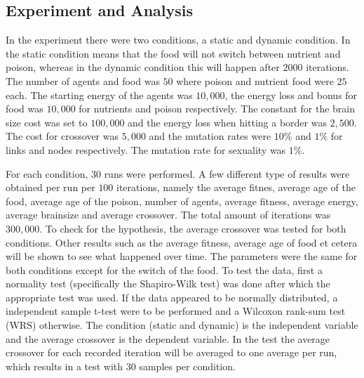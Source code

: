 \subsection{Experiment and Analysis}
In the experiment there were two conditions, a static and dynamic condition.
In the static condition means that the food will not switch between nutrient and poison, whereas in the dynamic condition this will happen after $2000$ iterations.
The number of agents and food was $50$ where poison and nutrient food were $25$ each.
The starting energy of the agents was $10,000$, the energy loss and bonus for food was $10,000$ for nutrients and poison respectively.
The constant for the brain size cost was set to $100,000$ and the energy loss when hitting a border was $2,500$.
The cost for crossover was $5,000$ and the mutation rates were $10\%$ and $1\%$ for links and nodes respectively.
The mutation rate for sexuality was $1\%$.

For each condition, $30$ runs were performed.
A few different type of results were obtained per run per $100$ iterations, namely the average fitnes, average age of the food, average age of the poison, number of agents, average fitness, average energy, average brainsize and average crossover.
The total amount of iterations was $300,000$.
To check for the hypothesis, the average crossover was tested for both conditions.
Other results such as the average fitness, average age of food et cetera will be shown to see what happened over time.
The parameters were the same for both conditions except for the switch of the food.
To test the data, first a normality test (specifically the Shapiro-Wilk test) was done after which the appropriate test was used.
If the data appeared to be normally distributed, a independent sample t-test were to be performed and a Wilcoxon rank-sum test (WRS) otherwise.
The condition (static and dynamic) is the independent variable and the average crossover is the dependent variable.
In the test the average crossover for each recorded iteration will be averaged to one average per run, which results in a test with $30$ samples per condition.